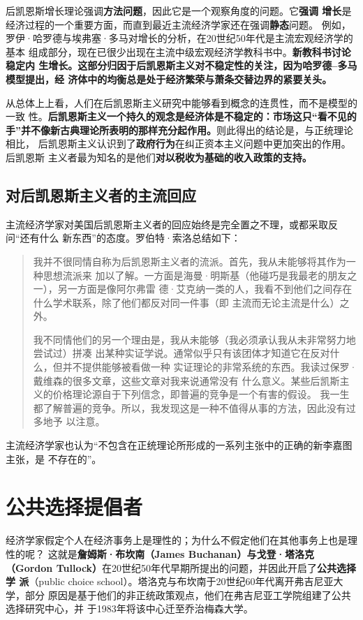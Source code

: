 后凯恩斯增长理论强调\textbf{方法问题}，因此它是一个观察角度的问题。它\textbf{强调
  增长}是经济过程的一个重要方面，而直到最近主流经济学家还在强调\textbf{静态}问题。
例如，罗伊·哈罗德与埃弗塞·多马对增长的分析，在20世纪50年代是主流宏观经济学的基本
组成部分，现在已很少出现在主流中级宏观经济学教科书中。\textbf{新教科书讨论稳定内
  生增长。这部分归因于后凯恩斯主义对不稳定性的关注，因为哈罗德--多马模型提出，经
  济体中的均衡总是处于经济繁荣与萧条交替边界的紧要关头。}

从总体上上看，人们在后凯恩斯主义研究中能够看到概念的连贯性，而不是模型的一致
性。\textbf{后凯恩斯主义一个持久的观念是经济体是不稳定的：市场这只“看不见的
  手”并不像新古典理论所表明的那样充分起作用。}则此得出的结论是，与正统理论相比，
后凯恩斯主义认识到了\textbf{政府行为}在纠正资本主义问题中更加突出的作用。后凯恩斯
主义者最为知名的是他们\textbf{对以税收为基础的收入政策的支持。}

\subsection{对后凯恩斯主义者的主流回应}

主流经济学家对美国后凯恩斯主义者的回应始终是完全置之不理，或都采取反问“还有什么
新东西”的态度。罗伯特·索洛总结如下：

\begin{quotation}
  我并不很同情自称为后凯恩斯主义者的流派。首先，我从未能够将其作为一种思想流派来
  加以了解。一方面是海曼·明斯基（他碰巧是我最老的朋友之一），另一方面是像阿尔弗雷
  德·艾克纳一类的人，我看不到他们之间存在什么学术联系，除了他们都反对同一件事（即
  主流而无论主流是什么）之外。

  我不同情他们的另一个理由是，我从未能够（我必须承认我从未非常努力地尝试过）拼凑
  出某种实证学说。通常似乎只有该团体才知道它在反对什么，但并不提供能够被看做一种
  实证理论的非常系统的东西。我读过保罗·戴维森的很多文章，这些文章对我来说通常没有
  什么意义。某些后凯斯主义的价格理论源自于下列信念，即普遍的竞争是一个有害的假设。
  我一生都了解普遍的竞争。所以，我发现这是一种不值得从事的方法，因此没有过多地予
  以注意。
\end{quotation}

主流经济学家也认为“不包含在正统理论所形成的一系列主张中的正确的新李嘉图主张，是
不存在的”。

\section{公共选择提倡者}

经济学家假定个人在经济事务上是理性的；为什么不假定他们在其他事务上也是理性的呢？
这就是\textbf{詹姆斯·布坎南（James Buchanan）与戈登·塔洛克（Gordon
  Tullock）}在20世纪50年代早期所提出的问题，并因此开启了\textbf{公共选择学
  派}（public choice school）。塔洛克与布坎南于20世纪60年代离开弗吉尼亚大学，部分
原因是基于他们的非正统政策观点，他们在弗吉尼亚工学院组建了公共选择研究中心，并
于1983年将该中心迁至乔治梅森大学。

